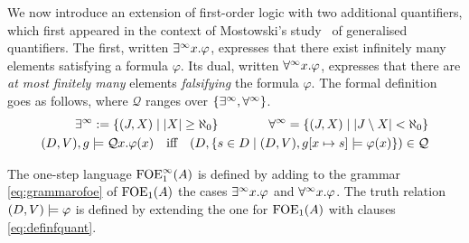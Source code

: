 We now introduce an extension of first-order logic with two additional quantifiers, which first appeared in the context of Mostowski's study~\cite{Mostowski1957} of generalised quantifiers. The first, written $\exists^\infty x. \varphi$, expresses that there exist infinitely many elements satisfying a formula $\varphi$. Its dual, written $\forall^\infty x. \varphi$, expresses that there are \emph{at most finitely many} elements \emph{falsifying} the formula $\varphi$. The formal definition goes as follows, where $\mathcal Q$ ranges over $\{\exists^\infty, \forall^\infty\}$.
\begin{equation}\label{eq:definfquant}
\begin{aligned}
\qu := \{(J,X) \mid |X| \geq \aleph_0\} \qquad \qquad \dqu =\{(J,X) \mid |J\setminus X| < \aleph_0\} \\
(D,V),\ass \models {\mathcal Q}x. \phi(x) \quad\text{iff}\quad (D , \{s\in D \mid (D, \val),\ass[x\mapsto s] \models \phi(x) \}) \in {\mathcal Q}
\end{aligned}
\end{equation}

\begin{definition}
The one-step language $\mathrm{FOE}^{\infty}_1(A)$ is defined by adding to the grammar \eqref{eq:grammarofoe} of $\mathrm{FOE}_1(A)$ the cases $\exists^\infty x. \varphi$ and $\forall^\infty x. \varphi$. The truth relation $(D, V) \models \varphi$ is defined by extending the one for $\mathrm{FOE}_1(A)$ with clauses \eqref{eq:definfquant}.
\end{definition}


